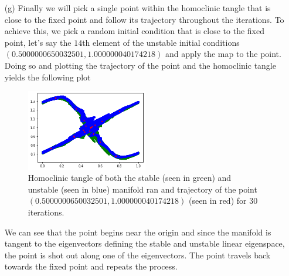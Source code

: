 \documentclass[12pt]{report}
\begin{document}
\begin{solution}
\begin{enumerate}
        
        \item [(g)]
        Finally we will pick a single point within the homoclinic tangle that is close to the fixed point and follow its trajectory throughout the iterations. To achieve this, we pick a random initial condition that is close to the fixed point, let's say the $14$th element of the unstable initial conditions $(0.5000000650032501, 1.000000040174218)$ and apply the map to the point. Doing so and plotting the trajectory of the point and the homoclinic tangle yields the following plot
        \begin{figure}[H]
            \centering
            \hspace*{0cm}\includegraphics[width=0.5\textwidth,height=\textwidth,keepaspectratio]{images/7-g.png}
            \caption{Homoclinic tangle of both the stable (seen in green) and unstable (seen in blue) manifold ran and trajectory of the point $(0.5000000650032501, 1.000000040174218)$ (seen in red) for $30$ iterations.}
        \end{figure}
        We can see that the point begins near the origin and since the manifold is tangent to the eigenvectors defining the stable and unstable linear eigenspace, the point is shot out along one of the eigenvectors. The point travels back towards the fixed point and repeats the process. 



\end{enumerate}
\end{solution}
\end{document}
